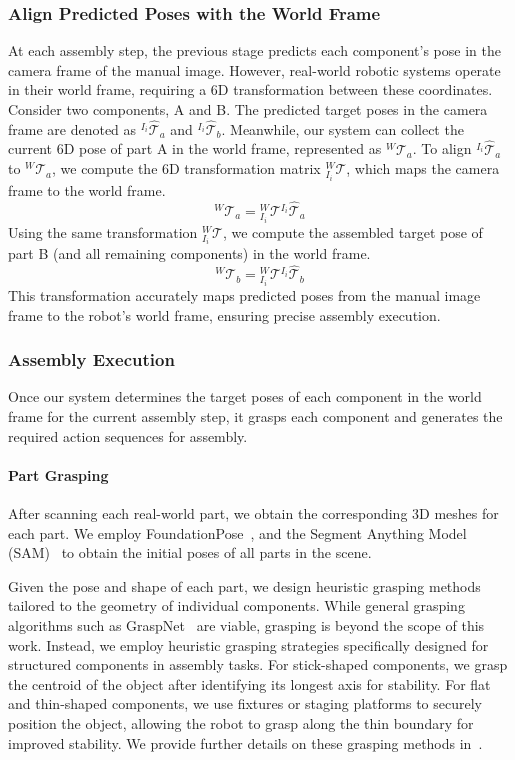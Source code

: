 \subsubsection{Align Predicted Poses with the World Frame}
At each assembly step, the previous stage predicts each component's pose in the camera frame of the manual image. However, real-world robotic systems operate in their world frame, requiring a 6D transformation between these coordinates. Consider two components, A and B. The predicted target poses in the camera frame are denoted as $^{I_i}\hat{\mathcal{T}}_a$ and $^{I_i}\hat{\mathcal{T}}_b$. Meanwhile, our system can collect the current 6D pose of part A in the world frame, represented as $^{W}\mathcal{T}_a$. 
To align $^{I_i}\hat{\mathcal{T}}_a$ to $^{W}\mathcal{T}_a$, we compute the 6D transformation matrix ${}^{W}_{I_i}\mathcal{T}$, which maps the camera frame to the world frame.
\begin{equation}
    ^{W}\mathcal{T}_a = {}^{W}_{I_i}\mathcal{T}  {}^{I_i}\hat{\mathcal{T}}_a
\end{equation}
Using the same transformation ${}^{W}_{I_i}\mathcal{T}$, we compute the assembled target pose of part B (and all remaining components) in the world frame.
\begin{equation}
    ^{W}\mathcal{T}_b = {}^{W}_{I_i}\mathcal{T}  {}^{I_i}\hat{\mathcal{T}}_b
\end{equation}
This transformation accurately maps predicted poses from the manual image frame to the robot's world frame, ensuring precise assembly execution.

\subsubsection{Assembly Execution}
Once our system determines the target poses of each component in the world frame for the current assembly step, it grasps each component and generates the required action sequences for assembly.

\paragraph{Part Grasping}
After scanning each real-world part, we obtain the corresponding 3D meshes for each part. We employ FoundationPose~\cite{wen2024foundationpose}, and the Segment Anything Model (SAM)~\cite{kirillov2023segany} to obtain the initial poses of all parts in the scene.

Given the pose and shape of each part, we design heuristic grasping methods tailored to the geometry of individual components. While general grasping algorithms such as GraspNet~\cite{fang2023anygrasp} are viable, grasping is beyond the scope of this work. Instead, we employ heuristic grasping strategies specifically designed for structured components in assembly tasks. For stick-shaped components, we grasp the centroid of the object after identifying its longest axis for stability. For flat and thin-shaped components, we use fixtures or staging platforms to securely position the object, allowing the robot to grasp along the thin boundary for improved stability. We provide further details on these grasping methods in~.

